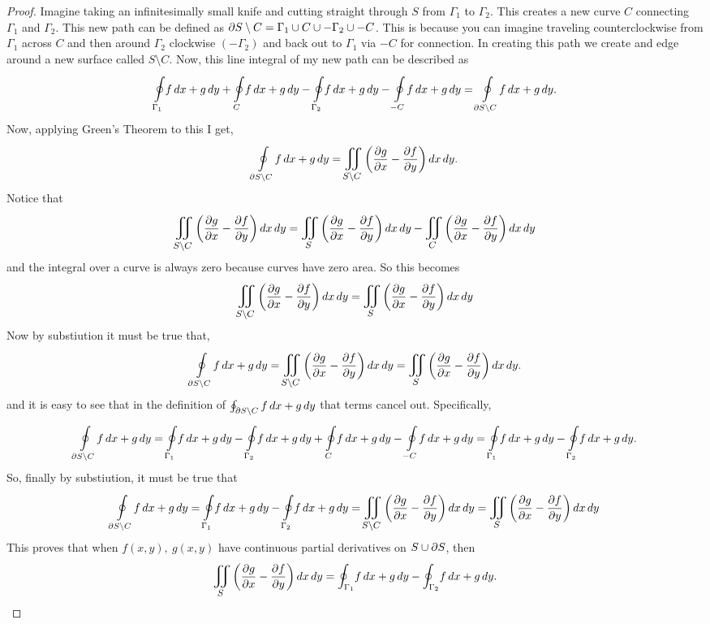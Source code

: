 \documentclass[titlepage]{article}
\begin{document}
\begin{proof}
Imagine taking an infinitesimally small knife and cutting straight through $S$ from $\Gamma_1$ to $\Gamma_2$. This creates a new curve $C$ connecting $\Gamma_1$ and $\Gamma_2$. This new path can be defined as $\partial S\setminus C = \Gamma_1 \cup C \cup -\Gamma_2 \cup -C$. This is because you can imagine traveling counterclockwise from $\Gamma_1$ across $C$ and then around $\Gamma_2$ clockwise $(-\Gamma_2)$ and back out to $\Gamma_1$ via $-C$ for connection. In creating this path we create and edge around a new surface called $S\setminus C$. Now, this line integral of my new path can be described as 
$$\boint{\Gamma_1}{} f\,dx + g\,dy + \boint{C}{}  f\,dx + g\,dy - \boint{\Gamma_2}{}f\,dx + g\,dy - \boint{-C}{}f\,dx + g\,dy = \boint{\p S\setminus C}{}f\,dx + g\,dy.$$
Now, applying Green's Theorem to this I get,
$$\boint{\p S\setminus C}{}f\,dx + g\,dy  = \bigiint{S\setminus C}{} \left( \frac{\p g}{\p x} - \frac{\p f}{\p y} \right)dx\,dy.$$
Notice that 
$$\bigiint{S\setminus C}{} \left( \frac{\p g}{\p x} - \frac{\p f}{\p y} \right)dx\,dy = \bigiint{S}{} \left( \frac{\p g}{\p x} - \frac{\p f}{\p y} \right)dx\,dy - \bigiint{C}{} \left( \frac{\p g}{\p x} - \frac{\p f}{\p y} \right)dx\,dy$$
and the integral over a curve is always zero because curves have zero area. So this becomes
$$ \bigiint{S\setminus C}{} \left( \frac{\p g}{\p x} - \frac{\p f}{\p y} \right)dx\,dy = \bigiint{S}{} \left( \frac{\p g}{\p x} - \frac{\p f}{\p y} \right)dx\,dy$$
Now by substiution it must be true that,
$$ \boint{\p S\setminus C}{}f\,dx + g\,dy  = \bigiint{S\setminus C}{} \left( \frac{\p g}{\p x} - \frac{\p f}{\p y} \right)dx\,dy =  \bigiint{S}{} \left( \frac{\p g}{\p x} - \frac{\p f}{\p y} \right)dx\,dy.$$
and it is easy to see that in the definition of $\oint_{\partial S\setminus C}f\,dx + g\,dy$ that terms cancel out. Specifically, 
$$\boint{\p S\setminus C}{}f\,dx + g\,dy = \boint{\Gamma_1}{} f\,dx + g\,dy  - \boint{\Gamma_2}{}f\,dx + g\,dy + \boint{C}{}  f\,dx + g\,dy - \boint{-C}{}f\,dx + g\,dy =\boint{\Gamma_1}{} f\,dx + g\,dy  - \boint{\Gamma_2}{}f\,dx + g\,dy.$$
So, finally by substiution, it must be true that 
$$\boint{\p S\setminus C}{}f\,dx + g\,dy = \boint{\Gamma_1}{} f\,dx + g\,dy  - \boint{\Gamma_2}{}f\,dx + g\,dy  = \bigiint{S\setminus C}{} \left( \frac{\p g}{\p x} - \frac{\p f}{\p y} \right)dx\,dy =  \bigiint{S}{} \left( \frac{\p g}{\p x} - \frac{\p f}{\p y} \right)dx\,dy $$
This proves that when $f(x,y), \ g(x,y)$ have continuous partial derivatives on $S\cup \partial S$, then
$$\bigiint{S}{} \left( \frac{\p g}{\p x} - \frac{\p f}{\p y} \right)dx\,dy = \mathlarger\oint_{\Gamma_1}f\,dx + g\,dy - \mathlarger\oint_{\Gamma_2}f\,dx + g\,dy.$$
\end{proof}
\end{document}
